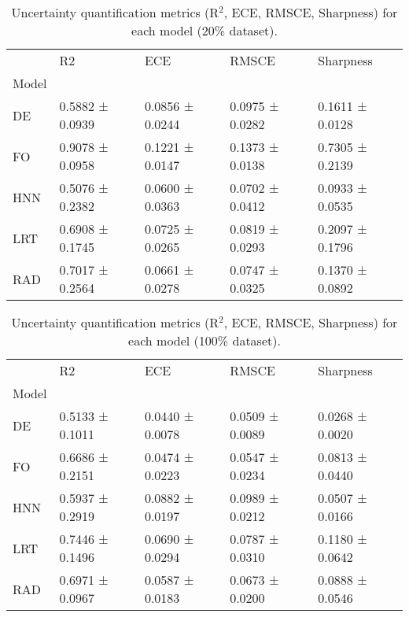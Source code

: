 \begin{table}
\caption{Uncertainty quantification metrics (R$^2$, ECE, RMSCE, Sharpness) for each model (20\% dataset).}
\label{tab:uncertainty_20}
\begin{tabular}{lllll}
\toprule
 & R2 & ECE & RMSCE & Sharpness \\
Model &  &  &  &  \\
\midrule
DE & 0.5882 ± 0.0939 & 0.0856 ± 0.0244 & 0.0975 ± 0.0282 & 0.1611 ± 0.0128 \\
FO & 0.9078 ± 0.0958 & 0.1221 ± 0.0147 & 0.1373 ± 0.0138 & 0.7305 ± 0.2139 \\
HNN & 0.5076 ± 0.2382 & 0.0600 ± 0.0363 & 0.0702 ± 0.0412 & 0.0933 ± 0.0535 \\
LRT & 0.6908 ± 0.1745 & 0.0725 ± 0.0265 & 0.0819 ± 0.0293 & 0.2097 ± 0.1796 \\
RAD & 0.7017 ± 0.2564 & 0.0661 ± 0.0278 & 0.0747 ± 0.0325 & 0.1370 ± 0.0892 \\
\bottomrule
\end{tabular}
\end{table}


\begin{table}
\caption{Uncertainty quantification metrics (R$^2$, ECE, RMSCE, Sharpness) for each model (100\% dataset).}
\label{tab:uncertainty_100}
\begin{tabular}{lllll}
\toprule
 & R2 & ECE & RMSCE & Sharpness \\
Model &  &  &  &  \\
\midrule
DE & 0.5133 ± 0.1011 & 0.0440 ± 0.0078 & 0.0509 ± 0.0089 & 0.0268 ± 0.0020 \\
FO & 0.6686 ± 0.2151 & 0.0474 ± 0.0223 & 0.0547 ± 0.0234 & 0.0813 ± 0.0440 \\
HNN & 0.5937 ± 0.2919 & 0.0882 ± 0.0197 & 0.0989 ± 0.0212 & 0.0507 ± 0.0166 \\
LRT & 0.7446 ± 0.1496 & 0.0690 ± 0.0294 & 0.0787 ± 0.0310 & 0.1180 ± 0.0642 \\
RAD & 0.6971 ± 0.0967 & 0.0587 ± 0.0183 & 0.0673 ± 0.0200 & 0.0888 ± 0.0546 \\
\bottomrule
\end{tabular}
\end{table}
